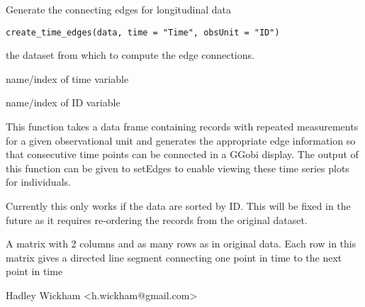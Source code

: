 \documentclass{article}
\begin{document}
\begin{Description}\relax
Generate the connecting edges for longitudinal data
\end{Description}
\begin{Usage}
\begin{verbatim}create_time_edges(data, time = "Time", obsUnit = "ID")\end{verbatim}
\end{Usage}
\begin{Arguments}
\begin{ldescription}
\item[\code{data}] the dataset from which to compute the edge connections.
\item[\code{time}] name/index of time variable
\item[\code{obsUnit}] name/index of ID variable
\end{ldescription}
\end{Arguments}
\begin{Details}\relax
This function takes a data frame containing records with repeated
measurements for a given observational unit and generates the
appropriate edge information so that consecutive time
points can be connected in a GGobi display. The output of this
function can be given to setEdges to enable
viewing these time series plots for individuals.

Currently this only works if the data are sorted by ID.
This will be fixed in the future as it requires re-ordering
the records from the original dataset.
\end{Details}
\begin{Value}
A matrix with 2 columns and as many rows as in original data.  Each row in this matrix gives a directed line segment connecting one point in time to the next point in time
\end{Value}
\begin{Author}\relax
Hadley Wickham <h.wickham@gmail.com>
\end{Author}
\begin{Examples}
\begin{ExampleCode}\end{ExampleCode}
\end{Examples}
\end{document}
